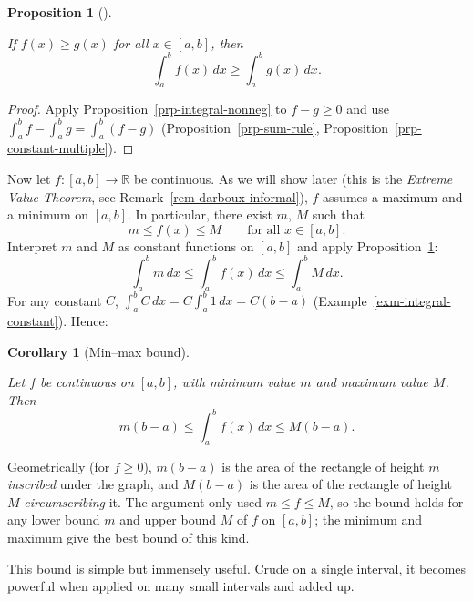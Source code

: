 \documentclass[
  letterpaper,
  DIV=11,
  numbers=noendperiod]{scrreprt}
\theoremstyle{plain}
\theoremstyle{plain}
\newtheorem{proposition}{Proposition}[chapter]
\theoremstyle{definition}
\theoremstyle{definition}
\theoremstyle{definition}
\theoremstyle{plain}
\theoremstyle{plain}
\newtheorem{corollary}{Corollary}[chapter]
\theoremstyle{remark}
\begin{document}
\begin{proposition}[]\protect\hypertarget{prp-integral-monotone}{}\label{prp-integral-monotone}

\hfill\break
If \(f(x)\ge g(x)\) for all \(x\in[a,b]\), then \[
\int_a^b f(x)\,dx \ge \int_a^b g(x)\,dx .
\]

\end{proposition}

\begin{proof}
Apply Proposition~\ref{prp-integral-nonneg} to \(f-g\ge0\) and use
\(\int_a^b f - \int_a^b g = \int_a^b (f-g)\)
(Proposition~\ref{prp-sum-rule},
Proposition~\ref{prp-constant-multiple}).
\end{proof}

Now let \(f\colon[a,b]\to\mathbb{R}\) be continuous. As we will show
later (this is the \emph{Extreme Value Theorem}, see
Remark~\ref{rem-darboux-informal}), \(f\) assumes a maximum and a
minimum on \([a,b]\). In particular, there exist \(m\), \(M\) such that
\[
m\le f(x)\le M \qquad\text{for all } x\in[a,b].
\] Interpret \(m\) and \(M\) as constant functions on \([a,b]\) and
apply Proposition~\ref{prp-integral-monotone}: \[
\int_a^b m\,dx \le \int_a^b f(x)\,dx \le \int_a^b M\,dx .
\] For any constant \(C\), \(\int_a^b C\,dx = C\int_a^b 1\,dx = C(b-a)\)
(Example~\ref{exm-integral-constant}). Hence:

\begin{corollary}[Min--max
bound]\protect\hypertarget{cor-min-max-bound}{}\label{cor-min-max-bound}

Let \(f\) be continuous on \([a,b]\), with minimum value \(m\) and
maximum value \(M\). Then \[
m(b-a) \le \int_a^b f(x)\,dx \le M(b-a).
\]

\end{corollary}

Geometrically (for \(f\ge0\)), \(m(b-a)\) is the area of the rectangle
of height \(m\) \emph{inscribed} under the graph, and \(M(b-a)\) is the
area of the rectangle of height \(M\) \emph{circumscribing} it. The
argument only used \(m\le f\le M\), so the bound holds for any lower
bound \(m\) and upper bound \(M\) of \(f\) on \([a,b]\); the minimum and
maximum give the best bound of this kind.

This bound is simple but immensely useful. Crude on a single interval,
it becomes powerful when applied on many small intervals and added up.
\end{document}
